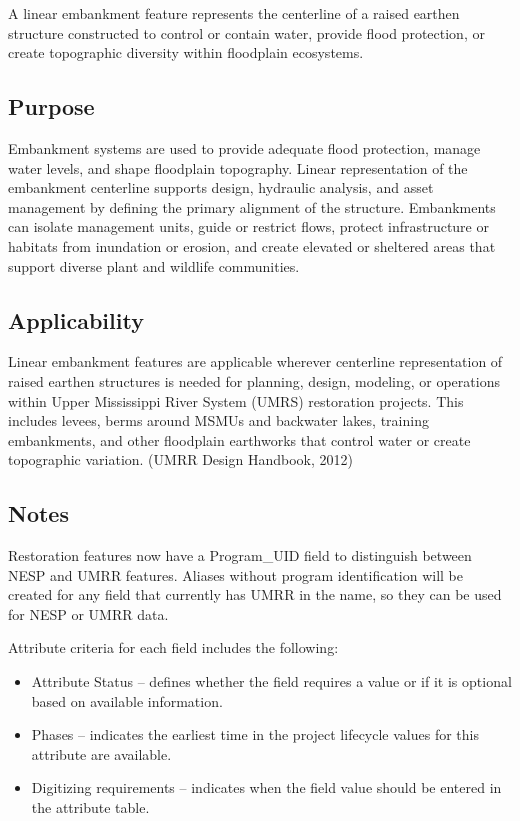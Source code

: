 \documentclass[
  letterpaper,
  DIV=11,
  numbers=noendperiod]{scrreprt}
\providecommand{\tightlist}{%
  \setlength{\itemsep}{0pt}\setlength{\parskip}{0pt}}
\begin{document}
A linear embankment feature represents the centerline of a raised
earthen structure constructed to control or contain water, provide flood
protection, or create topographic diversity within floodplain
ecosystems.

\subsection{Purpose}\label{purpose-4}

Embankment systems are used to provide adequate flood protection, manage
water levels, and shape floodplain topography. Linear representation of
the embankment centerline supports design, hydraulic analysis, and asset
management by defining the primary alignment of the structure.
Embankments can isolate management units, guide or restrict flows,
protect infrastructure or habitats from inundation or erosion, and
create elevated or sheltered areas that support diverse plant and
wildlife communities.

\subsection{Applicability}\label{applicability-2}

Linear embankment features are applicable wherever centerline
representation of raised earthen structures is needed for planning,
design, modeling, or operations within Upper Mississippi River System
(UMRS) restoration projects. This includes levees, berms around MSMUs
and backwater lakes, training embankments, and other floodplain
earthworks that control water or create topographic variation. (UMRR
Design Handbook, 2012)

\subsection{Notes}\label{notes-4}

Restoration features now have a Program\_UID field to distinguish
between NESP and UMRR features. Aliases without program identification
will be created for any field that currently has UMRR in the name, so
they can be used for NESP or UMRR data.

Attribute criteria for each field includes the following:

\begin{itemize}
\tightlist
\item
  Attribute Status -- defines whether the field requires a value or if
  it is optional based on available information.
\item
  Phases -- indicates the earliest time in the project lifecycle values
  for this attribute are available.
\item
  Digitizing requirements -- indicates when the field value should be
  entered in the attribute table.
\end{itemize}
\end{document}
